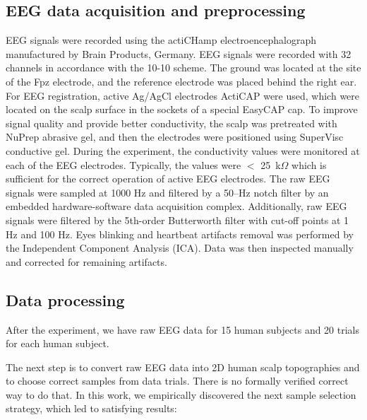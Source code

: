 \documentclass[conference]{IEEEtran}
\begin{document}
\subsection{EEG data acquisition and preprocessing}
EEG signals were recorded using the actiCHamp electroencephalograph manufactured by Brain Products, Germany. EEG signals were recorded with 32 channels in accordance with the 10-10 scheme. The ground was located at the site of the Fpz electrode, and the reference electrode was placed behind the right ear. For EEG registration, active Ag/AgCl electrodes ActiCAP were used, which were located on the scalp surface in the sockets of a special EasyCAP cap. To improve signal quality and provide better conductivity, the scalp was pretreated with NuPrep abrasive gel, and then the electrodes were positioned using SuperVisc conductive gel. During the experiment, the conductivity values were monitored at each of the EEG electrodes. Typically, the values were $<$ 25~k$\Omega$  which is sufficient for the correct operation of active EEG electrodes. The raw EEG signals were sampled at 1000 Hz and filtered by a 50--Hz notch filter by an embedded hardware-software data acquisition complex. Additionally, raw EEG signals were filtered by the 5th-order Butterworth filter with cut-off points at 1 Hz and 100 Hz. Eyes blinking and heartbeat artifacts removal was performed by the Independent Component Analysis (ICA). Data was then inspected manually and corrected for remaining artifacts.

\subsection{Data processing}\label{AA}
After the experiment, we have raw EEG data for 15 human subjects and 20 trials for each human subject. 

The next step is to convert raw EEG data into 2D human scalp topographies and to choose correct samples from data trials. There is no formally verified correct way to do that. In this work, we empirically discovered the next sample selection strategy, which led to satisfying results:
\end{document}
